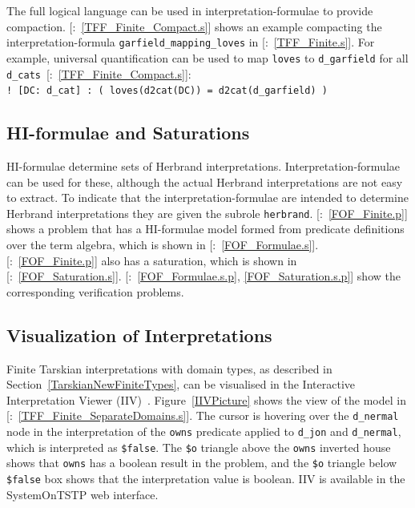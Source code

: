 \documentclass{easychair}
\newcommand{\smalltt}[1]{\small \texttt{#1}}
\newcommand{\example}{{\scriptsize \faFile[regular]}}
\begin{document}
The full logical language can be used in interpretation-formulae to provide compaction.
[\example{}:~\ref{TFF_Finite_Compact.s}] shows an example compacting 
the interpretation-formula \smalltt{garfield\_mapping\_loves} in
[\example{}:~\ref{TFF_Finite.s}].
For example, universal quantification can be used to map \smalltt{loves} to \smalltt{d\_garfield} 
for all \smalltt{d\_cats}~[\example{}:~\ref{TFF_Finite_Compact.s}]: \\
\hspace*{0.5cm}\smalltt{!\,[DC:\,d\_cat]\,:\,(\,loves(d2cat(DC))\,=\,d2cat(d\_garfield)\,)}

\subsection{HI-formulae and Saturations}
\label{NewHerbrand}

HI-formulae determine sets of Herbrand interpretations.
Interpretation-formulae can be used for these, although the actual Herbrand interpretations are
not easy to extract.
To indicate that the interpretation-formulae are intended to determine Herbrand interpretations 
they are given the subrole \smalltt{herbrand}.
[\example{}:~\ref{FOF_Finite.p}] shows a problem that has a HI-formulae
model formed from predicate definitions over the term algebra, which is shown in 
[\example{}:~\ref{FOF_Formulae.s}].
[\example{}:~\ref{FOF_Finite.p}] also has a saturation, which is shown 
in [\example{}:~\ref{FOF_Saturation.s}].
[\example{}:~\ref{FOF_Formulae.s.p}, \ref{FOF_Saturation.s.p}] show 
the corresponding verification problems.

\subsection{Visualization of Interpretations}
\label{IIV}

Finite Tarskian interpretations with domain types, as described in 
Section~\ref{TarskianNewFiniteTypes}, can be visualised in the Interactive Interpretation Viewer 
(IIV)~\cite{MS23-Poster}.
Figure~\ref{IIVPicture} shows the view of the model 
in [\example{}:~\ref{TFF_Finite_SeparateDomains.s}].
The cursor is hovering over the \smalltt{d\_nermal} node in the interpretation of the
\smalltt{owns} predicate applied to \smalltt{d\_jon} and \smalltt{d\_nermal}, which is 
interpreted as \smalltt{\$false}.
The \smalltt{\$o} triangle above the \smalltt{owns} inverted house shows that \smalltt{owns} has
a boolean result in the problem, and the \smalltt{\$o} triangle below \smalltt{\$false} box shows 
that the interpretation value is boolean.
IIV is available in the SystemOnTSTP web interface.
\end{document}
